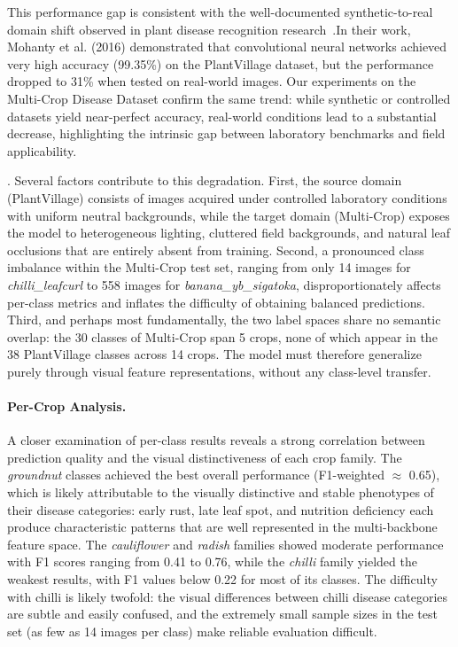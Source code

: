 \documentclass[pdflatex,sn-basic]{sn-jnl}
\begin{document}
This performance gap is consistent with the well-documented synthetic-to-real domain shift observed in plant disease recognition research~\cite{Mohanty2016}.In their work, Mohanty et al. (2016) demonstrated that convolutional neural networks achieved very high accuracy (99.35\%) on the PlantVillage dataset, but the performance dropped to 31\% when tested on real-world images. Our experiments on the Multi-Crop Disease Dataset confirm the same trend: while synthetic or controlled datasets yield near-perfect accuracy, real-world conditions lead to a substantial decrease, highlighting the intrinsic gap between laboratory benchmarks and field applicability.

. Several factors contribute to this degradation. First, the source domain (PlantVillage) consists of images acquired under controlled laboratory conditions with uniform neutral backgrounds, while the target domain (Multi-Crop) exposes the model to heterogeneous lighting, cluttered field backgrounds, and natural leaf occlusions that are entirely absent from training. Second, a pronounced class imbalance within the Multi-Crop test set, ranging from only 14 images for \textit{chilli\_leafcurl} to 558 images for \textit{banana\_yb\_sigatoka}, disproportionately affects per-class metrics and inflates the difficulty of obtaining balanced predictions. Third, and perhaps most fundamentally, the two label spaces share no semantic overlap: the 30 classes of Multi-Crop span 5 crops, none of which appear in the 38 PlantVillage classes across 14 crops. The model must therefore generalize purely through visual feature representations, without any class-level transfer.

\paragraph{Per-Crop Analysis.}
A closer examination of per-class results reveals a strong correlation between prediction quality and the visual distinctiveness of each crop family. The \textit{groundnut} classes achieved the best overall performance (F1-weighted $\approx$ 0.65), which is likely attributable to the visually distinctive and stable phenotypes of their disease categories: early rust, late leaf spot, and nutrition deficiency each produce characteristic patterns that are well represented in the multi-backbone feature space. The \textit{cauliflower} and \textit{radish} families showed moderate performance with F1 scores ranging from 0.41 to 0.76, while the \textit{chilli} family yielded the weakest results, with F1 values below 0.22 for most of its classes. The difficulty with chilli is likely twofold: the visual differences between chilli disease categories are subtle and easily confused, and the extremely small sample sizes in the test set (as few as 14 images per class) make reliable evaluation difficult.
\end{document}
